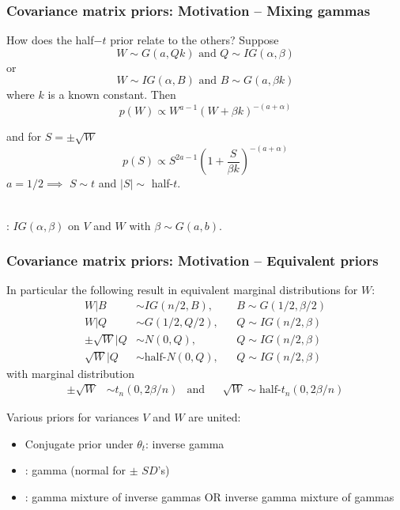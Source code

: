 \documentclass[xcolor=dvipsnames]{beamer}
\begin{document}


\begin{frame}
\frametitle{Covariance matrix priors: Motivation -- Mixing gammas}
How does the half$-t$ prior relate to the others? Suppose
\[
W\sim G(a,Qk) \mbox{ and } Q\sim IG(\alpha,\beta)
\]
or
\[
W\sim IG(\alpha, B) \mbox{ and } B\sim G(a,\beta k)
\]
where $k$ is a known constant. \pause Then
\[
p(W) \propto W^{a-1}(W + \beta k)^{-(a + \alpha)}
\]

and for $S=\pm\sqrt{W}$
\[
p(S) \propto S^{2a-1}\left(1 + \frac{S}{\beta k}\right)^{-(a + \alpha)}
\]
$a=1/2 \implies $ $S\sim t$ and $|S| \sim$ half-$t$.\\~

\pause \citet{huang2013simple}: $IG(\alpha,\beta)$ on $V$ and $W$ with $\beta\sim G(a,b)$.
\end{frame}

\begin{frame}
\frametitle{Covariance matrix priors: Motivation -- Equivalent priors}
In particular the following result in equivalent marginal distributions for $W$:
\begin{align*}
W|B &\sim IG(n/2,B), &&B\sim G(1/2,\beta/2)\\
W|Q &\sim G(1/2,Q/2), &&Q\sim IG(n/2,\beta)\\
\pm\sqrt{W}|Q &\sim N(0,Q), &&Q\sim IG(n/2,\beta)\\
\sqrt{W}|Q &\sim \mbox{half-}N(0,Q), &&Q\sim IG(n/2,\beta)
\end{align*}
with marginal distribution
\begin{align*}
\pm\sqrt{W} &\sim t_n(0,2\beta/n) &\mbox{and}&& \sqrt{W} \sim \mbox{half-}t_n(0,2\beta/n)
\end{align*}

\pause Various priors for variances $V$ and $W$ are united:
\begin{itemize}
\item Conjugate prior under $\theta_t$: inverse gamma
\item \citet{fruhwirth2008bayesian}: gamma (normal for $\pm$ $SD$'s)
\item \citet{gelman2006prior,huang2013simple}: gamma mixture of inverse gammas OR inverse gamma mixture of gammas
\end{itemize}
\end{frame}
\end{document}
